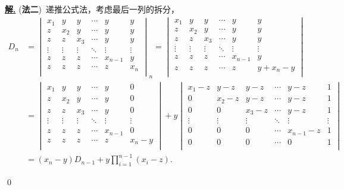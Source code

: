 \documentclass[10pt,openany]{article}
\theoremstyle{thmstyle} %
\theoremstyle{defstyle} %
\theoremstyle{prostyle} %
\theoremstyle{exastyle}
\theoremstyle{remstyle}
\newenvironment{solution}{\par\underline{\textbf{解.}} \;\fangsong}{\qed\par}
\begin{document}
\begin{solution}
	(\textbf{法二})\ 递推公式法，考虑最后一列的拆分，
	\begin{align*}
		D_n &= \begin{vmatrix}
			x_1 & y & y & \cdots & y & y \\
			z & x_2 & y & \cdots & y & y \\
			z & z & x_3 & \cdots & y & y \\
			\vdots & \vdots & \vdots & \ddots & \vdots & \vdots \\
			z & z & z & \cdots & x_{n-1} & y \\
			z & z & z & \cdots & z & x_n \\
		\end{vmatrix}_n= \begin{vmatrix}
		x_1 & y & y & \cdots & y & y \\
		z & x_2 & y & \cdots & y & y \\
		z & z & x_3 & \cdots & y & y \\
		\vdots & \vdots & \vdots & \ddots & \vdots & \vdots \\
		z & z & z & \cdots & x_{n-1} & y \\
		z & z & z & \cdots & z & y+x_n-y \\
		\end{vmatrix} \\
		&= \begin{vmatrix}
			x_1 & y & y & \cdots & y & 0 \\
			z & x_2 & y & \cdots & y & 0 \\
			z & z & x_3 & \cdots & y & 0 \\
			\vdots & \vdots & \vdots & \ddots & \vdots & \vdots \\
			z & z & z & \cdots & x_{n-1} & 0 \\
			z & z & z & \cdots & z & x_n-y \\
		\end{vmatrix}+y\begin{vmatrix}
		x_1-z & y-z & y-z & \cdots & y-z & 1 \\
		0 & x_2-z & y-z & \cdots & y-z & 1 \\
		0 & 0 & x_3-z & \cdots & y-z & 1 \\
		\vdots & \vdots & \vdots & \ddots & \vdots & \vdots \\
		0 & 0 & 0 & \cdots & x_{n-1}-z & 1 \\
		0 & 0 & 0 & \cdots & 0 & 1 \\
		\end{vmatrix} \\
		&= (x_n-y)D_{n-1}+y\prod_{i=1}^{n-1}(x_i-z).
	\end{align*}
	

\end{solution}
\end{document}
